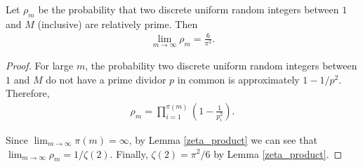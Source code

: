 \begin{thm}\label{zeta-2}
    Let $\rho_m$ be the probability that two discrete uniform random integers between $1$ and $M$ (inclusive) are relatively prime. Then
    \begin{align*}
        \lim_{m\to\infty}\rho_{m} = \frac{6}{\pi^2}.
    \end{align*}
\end{thm}

\begin{proof}
    For large $m$, the probability two discrete uniform random integers between $1$ and $M$ do not have a prime dividor $p$ in common is approximately $1 - 1/p^2$. Therefore,
    \begin{align*}
        \rho_m = \prod_{i=1}^{\pi(m)}\left(1 - \frac{1}{p_i^2}\right).
    \end{align*}

    Since $\lim_{m\to\infty}\pi(m) = \infty$, by Lemma \ref{zeta_product} we can see that $\lim_{m\to\infty}\rho_m = 1/\zeta(2)$. Finally, $\zeta(2) = \pi^2/6$ by Lemma \ref{zeta_product}.
\end{proof}

